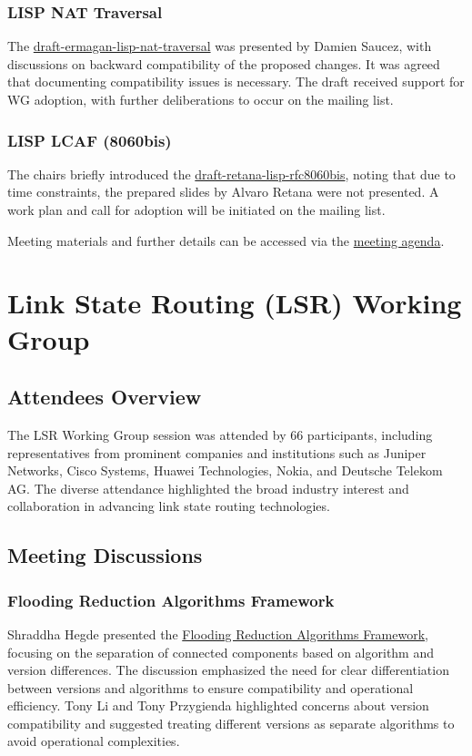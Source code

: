 \documentclass{article}
\begin{document}
\subsubsection{LISP NAT Traversal}
The \href{https://datatracker.ietf.org/doc/html/draft-ermagan-lisp-nat-traversal}{draft-ermagan-lisp-nat-traversal} was presented by Damien Saucez, with discussions on backward compatibility of the proposed changes. It was agreed that documenting compatibility issues is necessary. The draft received support for WG adoption, with further deliberations to occur on the mailing list.

\subsubsection{LISP LCAF (8060bis)}
The chairs briefly introduced the \href{https://datatracker.ietf.org/doc/html/draft-retana-lisp-rfc8060bis}{draft-retana-lisp-rfc8060bis}, noting that due to time constraints, the prepared slides by Alvaro Retana were not presented. A work plan and call for adoption will be initiated on the mailing list.

Meeting materials and further details can be accessed via the \href{https://datatracker.ietf.org/meeting/122/materials/agenda-122-lisp-00}{meeting agenda}.



\newpage

\section{Link State Routing (LSR) Working Group}

\subsection{Attendees Overview}
The LSR Working Group session was attended by 66 participants, including representatives from prominent companies and institutions such as Juniper Networks, Cisco Systems, Huawei Technologies, Nokia, and Deutsche Telekom AG. The diverse attendance highlighted the broad industry interest and collaboration in advancing link state routing technologies.

\subsection{Meeting Discussions}

\subsubsection{Flooding Reduction Algorithms Framework}
Shraddha Hegde presented the \href{https://datatracker.ietf.org/doc/draft-prz-lsr-interop-flood-reduction-architecture/}{Flooding Reduction Algorithms Framework}, focusing on the separation of connected components based on algorithm and version differences. The discussion emphasized the need for clear differentiation between versions and algorithms to ensure compatibility and operational efficiency. Tony Li and Tony Przygienda highlighted concerns about version compatibility and suggested treating different versions as separate algorithms to avoid operational complexities.
\end{document}
